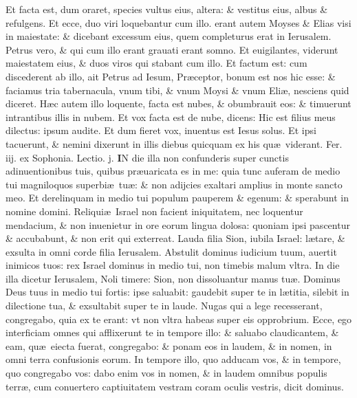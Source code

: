 \documentclass[a5paper,10pt]{book}
\def\rightmarginnote{%
	\lrmarginnote{\hskip\columnwidth \hskip -1em}}
\def\ae{æ}
\begin{document}
\begin{multicols*}{2}
Et facta est, dum oraret, species vultus eius, altera: \& vestitus eius, albus \& refulgens. Et ecce, duo viri loquebantur cum illo. erant autem Moyses \& Elias visi in maiestate: \& dicebant excessum eius, quem completurus erat in Ierusalem.
Petrus vero, \& qui cum illo erant grauati erant somno.
Et euigilantes, viderunt maiestatem eius, \& duos viros qui stabant cum illo.
Et factum est: cum discederent ab illo, ait Petrus ad Iesum, Pr\ae ceptor, bonum est nos hic esse: \& faciamus tria tabernacula, vnum tibi, \& vnum Moysi \& vnum Eli\ae , nesciens quid diceret.
H\ae c autem illo loquente, facta est nubes, \& obumbrauit eos: \& timuerunt intrantibus illis in nubem.
Et vox facta est de nube, dicens: Hic est filius meus dilectus: ipsum audite.
Et dum fieret vox, inuentus est Iesus solus. Et ipsi tacuerunt, \& nemini dixerunt in illis diebus quicquam ex his qu\ae \ viderant.
\newline {} \color{red} \hypertarget{TUE-QVARTA-ADV}{Fer. iij.} ex Sophonia. \hfill Lectio. j. \color{black}
\vspace{-.25em}
\lettrine[lines=2]{\bfseries I}{}N\rightmarginnote{ca. 3.} die illa non confunderis super cunctis adinuentionibus tuis, quibus pr\ae uaricata es in me: quia tunc auferam de medio tui magniloquos superbi\ae \ tu\ae : \& non adijcies exaltari amplius in monte sancto meo.
Et derelinquam in medio tui populum pauperem \& egenum: \& sperabunt in nomine domini.
Reliqui\ae \ Israel non facient iniquitatem, nec loquentur mendacium, \& non inuenietur in ore eorum lingua dolosa: quoniam ipsi pascentur \& accubabunt, \& non erit qui exterreat.
Lauda filia Sion, iubila Israel: l\ae tare, \& exsulta in omni corde filia Ierusalem.
Abstulit dominus iudicium tuum, auertit inimicos tuos: rex Israel dominus in medio tui, non timebis malum vltra.
In die illa dicetur Ierusalem, Noli timere: Sion, non dissoluantur manus tu\ae .
Dominus Deus tuus in medio tui fortis: ipse saluabit: gaudebit super te in l\ae titia, silebit in dilectione tua, \& exsultabit super te in laude.
Nugas qui a lege recesserant, congregabo, quia ex te erant: vt non vltra habeas super eis opprobrium.
Ecce, ego interficiam omnes qui afflixerunt te in tempore illo: \& saluabo claudicantem, \& eam, qu\ae \ eiecta fuerat, congregabo: \& ponam eos in laudem, \& in nomen, in omni terra confusionis eorum.
In tempore illo,
quo adducam vos, \& in tempore, quo congregabo vos: dabo enim vos in nomen, \& in laudem omnibus populis terr\ae , cum conuertero captiuitatem vestram coram oculis vestris, dicit dominus.

\end{multicols*}
\end{document}
